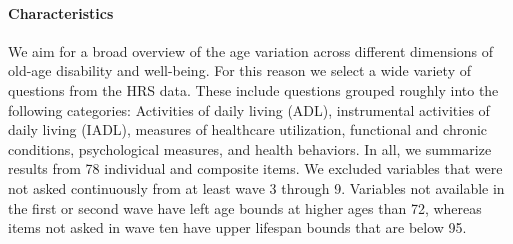 \documentclass{article}
\begin{document}



\paragraph*{Characteristics}
We aim for a broad overview of the age variation across different dimensions of
old-age disability and well-being. For this reason we select a wide variety of
questions from the HRS data. These include questions
grouped roughly into the following categories: Activities of daily living (ADL),
instrumental activities of daily living (IADL), measures of healthcare utilization, functional and chronic conditions, psychological
measures, and health behaviors. In all, we summarize results from 78
individual and composite items. We excluded variables that were not asked
continuously from at least wave 3 through 9. Variables not available in the
first or second wave have left age bounds at higher ages than 72, whereas items
not asked in wave ten have upper lifespan bounds that are below 95.
\end{document}
